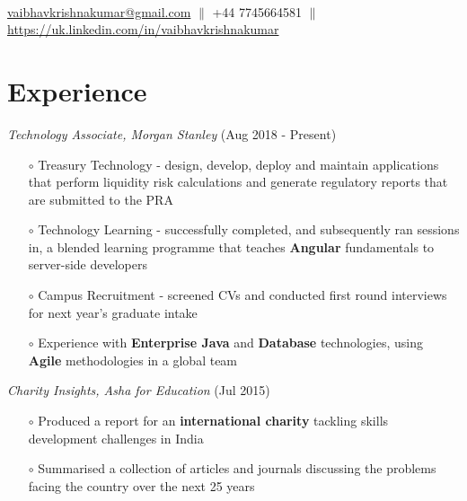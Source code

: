 \documentclass[a4paper]{article}
\begin{document}

{} \\
\href{mailto:vaibhavkrishnakumar@gmail.com} {vaibhavkrishnakumar@gmail.com} \hspace{10pt} $\parallel$ \hspace{10pt} +44 7745664581 \hspace{10pt} $\parallel$ \hspace{10pt} \href{https://uk.linkedin.com/in/vaibhavkrishnakumar} {https://uk.linkedin.com/in/vaibhavkrishnakumar}


\vspace{-12pt}
\section*{Experience}
\vspace{-7pt}

\textit{Technology Associate, Morgan Stanley} (Aug 2018 - Present)
\begin{itemize}
\item[$\circ$] Treasury Technology - design, develop, deploy and maintain applications that perform liquidity risk calculations and generate regulatory reports that are submitted to the PRA
\item[$\circ$] Technology Learning - successfully completed, and subsequently ran sessions in, a blended learning programme that teaches \textbf{Angular} fundamentals to server-side developers
\item[$\circ$] Campus Recruitment - screened CVs and conducted first round interviews for next year's graduate intake
\item[$\circ$] Experience with \textbf{Enterprise Java} and \textbf{Database} technologies, using \textbf{Agile} methodologies in a global team
\end{itemize}

\vspace{7pt}

\noindent \textit{Charity Insights, Asha for Education} (Jul 2015)
\begin{itemize}
\item[$\circ$] Produced a report for an \textbf{international charity} tackling skills development challenges in India
\item[$\circ$] Summarised a collection of articles and journals discussing the problems facing the country over the next 25 years
\end{itemize}
\end{document}
